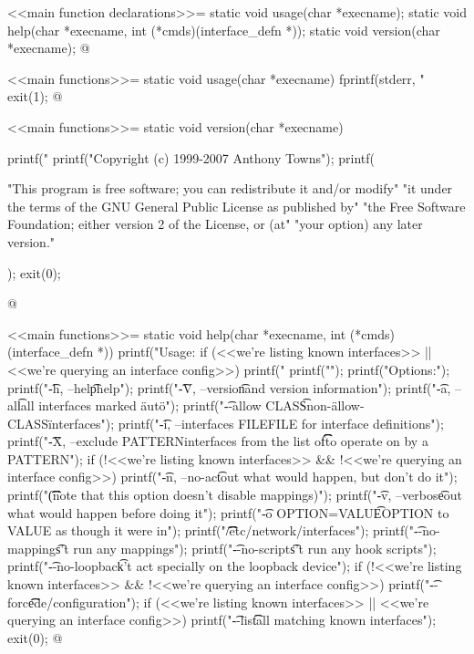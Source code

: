 \documentclass{article}
\begin{document}
<<main function declarations>>=
static void usage(char *execname);
static void help(char *execname, int (*cmds)(interface_defn *));
static void version(char *execname);
@ 

<<main functions>>=
static void usage(char *execname) {
	fprintf(stderr, "%
	exit(1);
}
@ 

<<main functions>>=
static void version(char *execname) {
	printf("%
	printf("Copyright (c) 1999-2007 Anthony Towns\n\n");
	printf(

"This program is free software; you can redistribute it and/or modify\n"
"it under the terms of the GNU General Public License as published by\n"
"the Free Software Foundation; either version 2 of the License, or (at\n"
"your option) any later version.\n"

	);
	exit(0);
}
@ 

<<main functions>>=
static void help(char *execname, int (*cmds)(interface_defn *)) {
	printf("Usage: %
	if (<<we're listing known interfaces>>
	    || <<we're querying an interface config>>)
		printf("       %
	printf("\n");
	printf("Options:\n");
	printf("\t-h, --help\t\tthis help\n");
	printf("\t-V, --version\t\tcopyright and version information\n");
	printf("\t-a, --all\t\tprocess all interfaces marked \"auto\"\n");
	printf("\t--allow CLASS\t\tignore non-\"allow-CLASS\" interfaces\n");
	printf("\t-i, --interfaces FILE\tuse FILE for interface definitions\n");
	printf("\t-X, --exclude PATTERN\texclude interfaces from the list of\n\t\t\t\tinterfaces to operate on by a PATTERN\n");
	if (!<<we're listing known interfaces>>
	    && !<<we're querying an interface config>>)
		printf("\t-n, --no-act\t\tprint out what would happen, but don't do it\n");
	printf("\t\t\t\t(note that this option doesn't disable mappings)\n");
	printf("\t-v, --verbose\t\tprint out what would happen before doing it\n");
	printf("\t-o OPTION=VALUE\t\tset OPTION to VALUE as though it were in\n");
	printf("\t\t\t\t/etc/network/interfaces\n");
	printf("\t--no-mappings\t\tdon't run any mappings\n");
	printf("\t--no-scripts\t\tdon't run any hook scripts\n");
	printf("\t--no-loopback\t\tdon't act specially on the loopback device\n");
	if (!<<we're listing known interfaces>>
	    && !<<we're querying an interface config>>)
		printf("\t--force\t\t\tforce de/configuration\n");
	if (<<we're listing known interfaces>>
	    || <<we're querying an interface config>>)
		printf("\t--list\t\t\tlist all matching known interfaces\n");
	exit(0);
}
@ 
\end{document}
